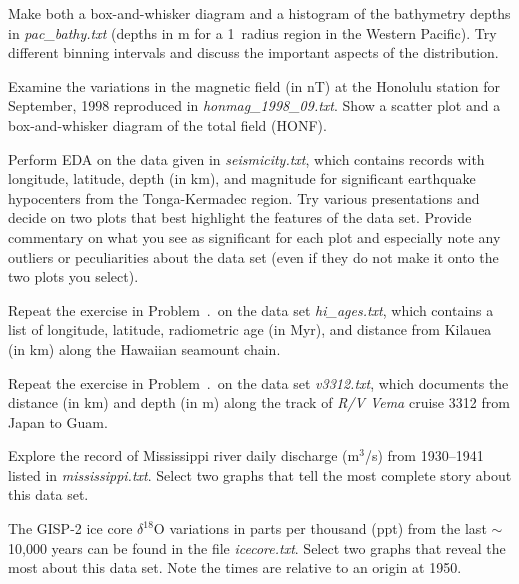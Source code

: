 \begin{problem}
Make both a box-and-whisker diagram and a histogram of the bathymetry depths in \emph{pac\_bathy.txt}
(depths in m for a 1\DS\ radius region in the Western Pacific).  Try different binning intervals and discuss
the important aspects of the distribution.
\end{problem}

\begin{problem}
Examine the variations in the magnetic field (in nT) at the Honolulu station for September, 1998 reproduced in \emph{honmag\_1998\_09.txt}.
Show a scatter plot and a box-and-whisker diagram of the total field (HONF).
\end{problem}

\begin{problem}
\setcounter{EDA}{\theproblem}
Perform EDA on the data given in \emph{seismicity.txt}, which
contains records with longitude, latitude, depth (in km), and magnitude for significant
earthquake hypocenters from the Tonga-Kermadec region.  Try various presentations and
decide on two plots that best highlight the features of the data
set.  Provide commentary on what you see as significant for each plot and especially
note any outliers or peculiarities about the data set (even if they do not make it onto the two
plots you select).
\end{problem}

\begin{problem}
Repeat the exercise in Problem~\thechapter.\theEDA\ on the data set \emph{hi\_ages.txt}, which contains a
list of longitude, latitude, radiometric age (in Myr), and distance from Kilauea (in km) along the Hawaiian
seamount chain.
\end{problem}

\begin{problem}
Repeat the exercise in Problem~\thechapter.\theEDA\ on the data set \emph{v3312.txt}, which documents the distance
(in km) and depth (in m) along the track of \emph{R/V Vema} cruise 3312 from Japan to Guam.
\end{problem}

\begin{problem}
Explore the record of Mississippi river daily discharge (m$^3$/s) from 1930--1941 listed in \emph{mississippi.txt}.
Select two graphs that tell the most complete story about this data set.
\end{problem}

\begin{problem}
The GISP-2 ice core $\delta^{18}$O variations in parts per thousand (ppt) from the last $\sim$10,000 years can be found in
the file \emph{icecore.txt}.  Select two graphs that reveal the most about this data set.
Note the times are relative to an origin at 1950.
\end{problem}

